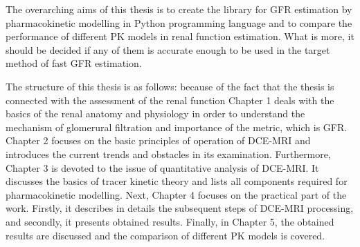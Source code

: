The overarching aims of this thesis is to create the library for GFR estimation by pharmacokinetic modelling in Python programming language and to compare the performance of different PK models in renal function estimation. What is more, it should be decided if any of them is accurate enough to be used in the target method of fast GFR estimation. 

The structure of this thesis is as follows:
because of the fact that the thesis is connected with the assessment of the renal function Chapter 1 deals with the basics of the renal anatomy and physiology in order to understand the mechanism of glomerural filtration and importance of the metric, which is GFR.
Chapter 2 focuses on the basic principles of operation of DCE-MRI and introduces the current trends and obstacles in its examination.  
Furthermore, Chapter 3 is devoted to the issue of quantitative analysis of DCE-MRI. 
It discusses the  basics of tracer kinetic theory and lists all components required for pharmacokinetic modelling.  
Next, Chapter 4 focuses on the practical part of the work.  
Firstly, it describes in details the subsequent steps of DCE-MRI processing, and secondly, it presents obtained results. 
Finally, in Chapter 5, the obtained results are discussed and the comparison of different PK models is covered. 


